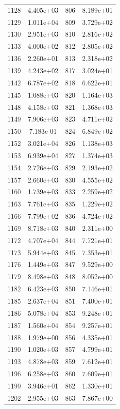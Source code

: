 \documentclass[12pt]{article}
\begin{document}
\begin{longtable}{@{}cccc@{}}
1128 & 4.405e+03 & 806 & 8.189e+01 \\
1129 & 1.011e+04 & 809 & 3.729e+02 \\
1130 & 2.951e+03 & 810 & 2.816e+02 \\
1133 & 4.000e+02 & 812 & 2.805e+02 \\
1136 & 2.260e+01 & 813 & 2.318e+02 \\
1139 & 4.243e+02 & 817 & 3.024e+01 \\
1142 & 6.787e+02 & 818 & 6.622e+01 \\
1145 & 1.088e+03 & 820 & 1.164e+03 \\
1148 & 4.158e+03 & 821 & 1.368e+03 \\
1149 & 7.906e+03 & 823 & 4.711e+02 \\
1150 & 7.183e-01 & 824 & 6.849e+02 \\
1152 & 3.021e+04 & 826 & 1.138e+03 \\
1153 & 6.939e+04 & 827 & 1.374e+03 \\
1154 & 2.726e+03 & 829 & 2.193e+02 \\
1157 & 2.660e+03 & 830 & 4.555e+02 \\
1160 & 1.739e+03 & 833 & 2.259e+02 \\
1163 & 7.761e+03 & 835 & 1.229e+02 \\
1166 & 7.799e+02 & 836 & 4.724e+02 \\
1169 & 8.718e+03 & 840 & 2.311e+00 \\
1172 & 4.707e+04 & 844 & 7.721e+01 \\
1173 & 5.944e+03 & 845 & 7.353e+01 \\
1176 & 1.449e+03 & 847 & 9.529e+00 \\
1179 & 8.498e+03 & 848 & 8.052e+00 \\
1182 & 6.423e+03 & 850 & 7.146e+01 \\
1185 & 2.637e+04 & 851 & 7.400e+01 \\
1186 & 5.078e+04 & 853 & 9.248e+01 \\
1187 & 1.560e+04 & 854 & 9.257e+01 \\
1188 & 1.979e+00 & 856 & 4.335e+01 \\
1190 & 1.020e+03 & 857 & 4.799e+01 \\
1193 & 4.878e+03 & 859 & 7.612e+01 \\
1196 & 6.258e+03 & 860 & 7.609e+01 \\
1199 & 3.946e+01 & 862 & 1.330e+01 \\
1202 & 2.955e+03 & 863 & 7.867e+00 \\

\bottomrule
\end{longtable}
\end{document}
